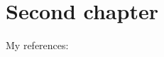 \documentclass[../main]{subfiles}
\begin{document}
\newrefsection
\chapter{Second chapter}

My references: \cite{B}

\printbibliography
\end{document}
